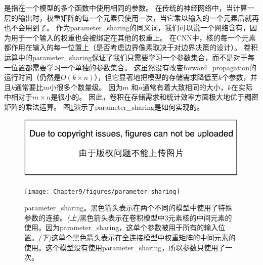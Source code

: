 是指在一个模型的多个函数中使用相同的参数。
在传统的神经网络中，当计算一层的输出时，权重矩阵的每一个元素只使用一次，当它乘以输入的一个元素后就再也不会用到了。
作为\gls{parameter_sharing}的同义词，我们可以说一个网络含有，因为用于一个输入的权重也会被绑定在其他的权重上。
在\gls{CNN}中，核的每一个元素都作用在输入的每一位置上（是否考虑边界像素取决于对边界决策的设计）。
卷积运算中的\gls{parameter_sharing}保证了我们只需要学习一个参数集合，而不是对于每一位置都需要学习一个单独的参数集合。
这虽然没有改变\gls{forward_propagation}的运行时间（仍然是$O(k\times n)$），但它显著地把模型的存储需求降低至$k$个参数，并且$k$通常要比$m$小很多个数量级。
因为$m$ 和$n$通常有着大致相同的大小，$k$在实际中相对于$m\times n$是很小的。
因此，卷积在存储需求和统计效率方面极大地优于稠密矩阵的乘法运算。
图\ref{fig:chap9_parameter_sharing}演示了\gls{parameter_sharing}是如何实现的。
\begin{figure}[!htb]
\ifOpenSource
\centerline{\includegraphics{figure.pdf}}
\else
\centerline{\texttt{[image: Chapter9/figures/parameter\_sharing]}}
\fi
\caption{\gls{parameter_sharing}。黑色箭头表示在两个不同的模型中使用了特殊参数的连接。\emph{(上)}黑色箭头表示在卷积模型中3元素核的中间元素的使用。因为\gls{parameter_sharing}，这单个参数被用于所有的输入位置。\emph{(下)}这单个黑色箭头表示在全连接模型中权重矩阵的中间元素的使用。这个模型没有使用\gls{parameter_sharing}，所以参数只使用了一次。}
\label{fig:chap9_parameter_sharing}
\end{figure}
 
 
